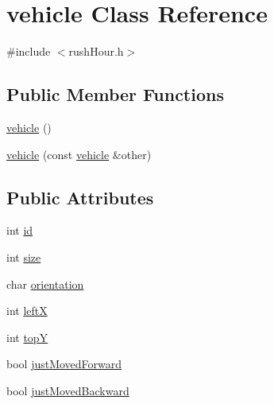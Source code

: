 \hypertarget{classvehicle}{\section{vehicle Class Reference}
\label{classvehicle}
}


{\ttfamily \#include $<$rush\-Hour.\-h$>$}

\subsection*{Public Member Functions}
\begin{DoxyCompactItemize}
\item 
\hyperlink{classvehicle_abf5643774310a3300a2637e20f0b6fee}{vehicle} ()
\item 
\hyperlink{classvehicle_af35c0d1042575793c0712c3560e03885}{vehicle} (const \hyperlink{classvehicle}{vehicle} \&other)
\end{DoxyCompactItemize}
\subsection*{Public Attributes}
\begin{DoxyCompactItemize}
\item 
int \hyperlink{classvehicle_aaeb2fbb86781433397e3cb4310c1fa0d}{id}
\item 
int \hyperlink{classvehicle_ab06480dfddc3c0b8696140fb5c649369}{size}
\item 
char \hyperlink{classvehicle_a79550d470251103a9634b1393e83317d}{orientation}
\item 
int \hyperlink{classvehicle_a37846d9843132d09e8677bd73a941c54}{left\-X}
\item 
int \hyperlink{classvehicle_a718a7fb37dec5ed7d0fec708027ba296}{top\-Y}
\item 
bool \hyperlink{classvehicle_a78d0fa57fbe7f0554e8f8ca72caa3bc8}{just\-Moved\-Forward}
\item 
bool \hyperlink{classvehicle_a9d80854d25aa46fc90343e677ea9a13e}{just\-Moved\-Backward}
\end{DoxyCompactItemize}



